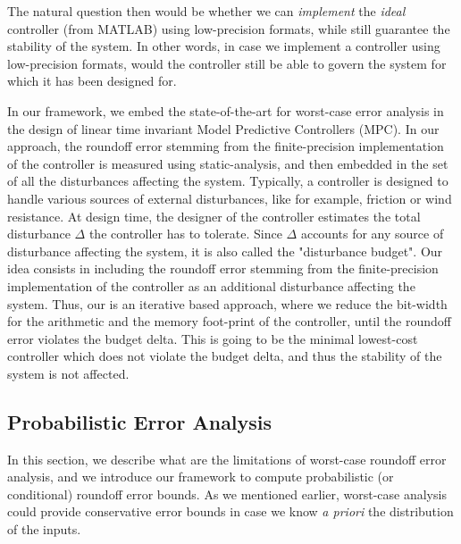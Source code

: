 The natural question then would be whether we can \emph{implement} the \emph{ideal} controller (from MATLAB) using low-precision formats, while still guarantee the stability of the system.
%
In other words, in case we implement a controller using low-precision formats, would the controller still be able to govern the system for which it has been designed for.
%

In our framework, we embed the state-of-the-art for worst-case error analysis in the design of linear time invariant Model Predictive Controllers (MPC).
%
In our approach, the roundoff error stemming from the finite-precision implementation of the controller is measured using static-analysis, and then embedded in the set of all the disturbances affecting the system.
%
Typically, a controller is designed to handle various sources of external disturbances, like for example, friction or wind resistance.
%
At design time, the designer of the controller estimates the total disturbance $\Delta$ the controller has to tolerate.
%
Since $\Delta$ accounts for any source of disturbance affecting the system, it is also called the "disturbance budget".
%
Our idea consists in including the roundoff error stemming from the finite-precision implementation of the controller as an additional disturbance affecting the system.
%
Thus, our is an iterative based approach, where we reduce the bit-width for the arithmetic and the memory foot-print of the controller, until the roundoff error violates the budget delta.
%
This is going to be the minimal lowest-cost controller which does not violate the budget delta, and thus the stability of the system is not affected.
%

%
%  
%  
%
%
%
%
\subsection{Probabilistic Error Analysis}
\label{sec:prob}
%
In this section, we describe what are the limitations of worst-case roundoff error analysis, and we introduce our framework to compute probabilistic (or conditional) roundoff error bounds.
%
As we mentioned earlier, worst-case analysis could provide conservative error bounds in case we know \emph{a priori} the distribution of the inputs. 
%
%


